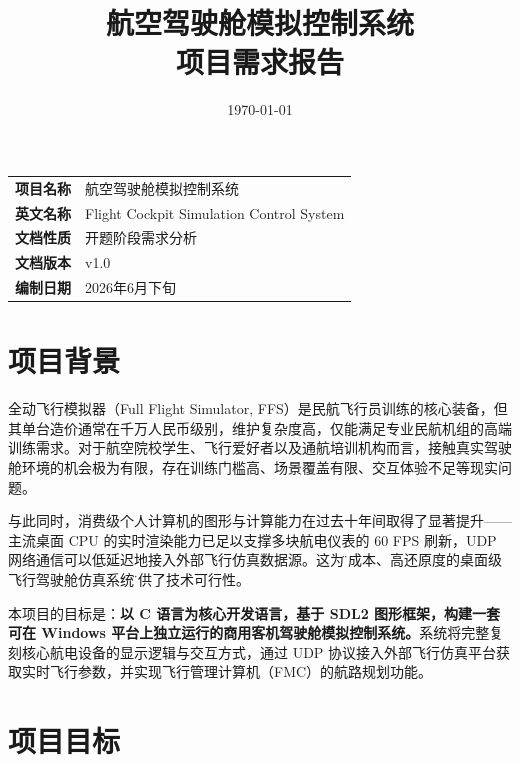 \documentclass[12pt,a4paper]{ctexart}
\title{\textbf{航空驾驶舱模拟控制系统 \\ 项目需求报告}}
\author{}
\date{\today}
\begin{document}
\maketitle

\vspace{1.5cm}

\begin{center}
\begin{tabular}{rl}
\textbf{项目名称} & 航空驾驶舱模拟控制系统 \\
\textbf{英文名称} & Flight Cockpit Simulation Control System \\
\textbf{文档性质} & 开题阶段需求分析 \\
\textbf{文档版本} & v1.0 \\
\textbf{编制日期} & 2026年6月下旬 \\
\end{tabular}
\end{center}

\newpage

\tableofcontents
\newpage

\section{项目背景}


全动飞行模拟器（Full Flight Simulator, FFS）是民航飞行员训练的核心装备，但其单台造价通常在千万人民币级别，维护复杂度高，仅能满足专业民航机组的高端训练需求。对于航空院校学生、飞行爱好者以及通航培训机构而言，接触真实驾驶舱环境的机会极为有限，存在训练门槛高、场景覆盖有限、交互体验不足等现实问题。

与此同时，消费级个人计算机的图形与计算能力在过去十年间取得了显著提升——主流桌面 CPU 的实时渲染能力已足以支撑多块航电仪表的 60 FPS 刷新，UDP 网络通信可以低延迟地接入外部飞行仿真数据源。这为\"低成本、高还原度的桌面级飞行驾驶舱仿真系统\"提供了技术可行性。

本项目的目标是：\textbf{以 C 语言为核心开发语言，基于 SDL2 图形框架，构建一套可在 Windows 平台上独立运行的商用客机驾驶舱模拟控制系统。}系统将完整复刻核心航电设备的显示逻辑与交互方式，通过 UDP 协议接入外部飞行仿真平台获取实时飞行参数，并实现飞行管理计算机（FMC）的航路规划功能。

\section{项目目标}
\end{document}
